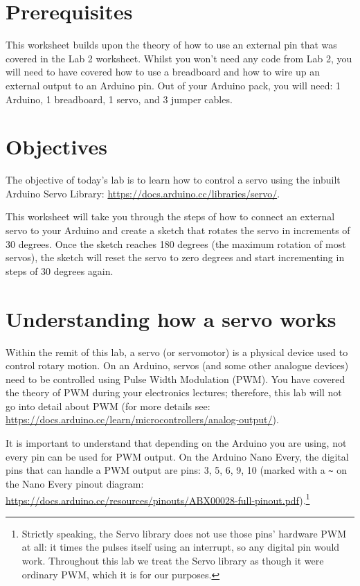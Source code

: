 \documentclass[11pt,a4paper]{article}
\begin{document}
\pagestyle{fancy}

\section*{Prerequisites}
This worksheet builds upon the theory of how to use an external pin that was covered in the Lab 2 worksheet. Whilst you won't need any code from Lab 2, you will need to have covered how to use a breadboard and how to wire up an external output to an Arduino pin. Out of your Arduino pack, you will need: 1 Arduino, 1 breadboard, 1 servo, and 3 jumper cables.

\section*{Objectives}
The objective of today's lab is to learn how to control a servo using the inbuilt Arduino Servo Library: \url{https://docs.arduino.cc/libraries/servo/}.

This worksheet will take you through the steps of how to connect an external servo to your Arduino and create a sketch that rotates the servo in increments of 30 degrees. Once the sketch reaches 180 degrees (the maximum rotation of most servos), the sketch will reset the servo to zero degrees and start incrementing in steps of 30 degrees again.

\section*{Understanding how a servo works}
Within the remit of this lab, a servo (or servomotor) is a physical device used to control rotary motion. On an Arduino, servos (and some other analogue devices) need to be controlled using Pulse Width Modulation (PWM). You have covered the theory of PWM during your electronics lectures; therefore, this lab will not go into detail about PWM (for more details see: \url{https://docs.arduino.cc/learn/microcontrollers/analog-output/}).

It is important to understand that depending on the Arduino you are using, not every pin can be used for PWM output. On the Arduino Nano Every, the digital pins that can handle a PWM output are pins: 3, 5, 6, 9, 10 (marked with a \verb|~| on the Nano Every pinout diagram: \url{https://docs.arduino.cc/resources/pinouts/ABX00028-full-pinout.pdf}).\footnote{Strictly speaking, the Servo library does not use those pins' hardware PWM at all: it times the pulses itself using an interrupt, so any digital pin would work. Throughout this lab we treat the Servo library as though it were ordinary PWM, which it is for our purposes.}
\end{document}
